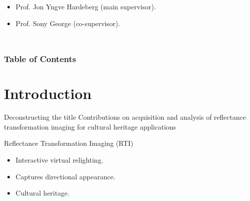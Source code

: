 \documentclass{beamer}
\begin{document}
{\begin{frame}
\begin{columns}
\begin{itemize} \color{ntnublue}
    \item Prof. Jon Yngve Hardeberg (main supervisor).
    \item Prof. Sony George (co-supervisor).
\end{itemize}
\end{columns}


\end{frame}
}

{
\begin{frame}
\frametitle{Table of Contents}
\tableofcontents
\end{frame}
}


\section{Introduction}



\begin{frame}{Deconstructing the title}
\centering
\alert<5>{Contributions} on \alert<4>{ acquisition} and \alert<4>{analysis} of \alert<2>{reflectance transformation imaging} for \alert<3>{cultural heritage applications}


\end{frame}



\begin{frame}{Reflectance Transformation Imaging (RTI)}

        \begin{itemize}
            \item<2-> Interactive virtual relighting.
            \item<3-> Captures directional appearance.
            \item<4-> Cultural heritage.
        \end{itemize}
        
        
\end{frame}
\end{document}
